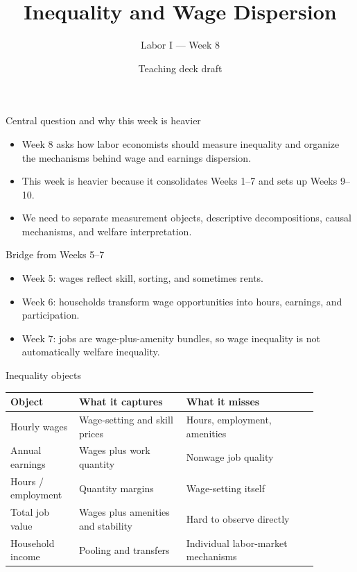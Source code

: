 \documentclass[aspectratio=169,11pt]{beamer}
\title{Inequality and Wage Dispersion}
\subtitle{Labor I --- Week 8}
\author{Teaching deck draft}
\date{}
\begin{document}
\begin{frame}
  \titlepage
\end{frame}

\begin{frame}{Central question and why this week is heavier}
\begin{itemize}
    \item Week 8 asks how labor economists should measure inequality and organize the mechanisms behind wage and earnings dispersion.
    \item This week is heavier because it consolidates Weeks 1--7 and sets up Weeks 9--10.
    \item We need to separate measurement objects, descriptive decompositions, causal mechanisms, and welfare interpretation.
\end{itemize}
\end{frame}

\begin{frame}{Bridge from Weeks 5--7}
\begin{itemize}
    \item Week 5: wages reflect skill, sorting, and sometimes rents.
    \item Week 6: households transform wage opportunities into hours, earnings, and participation.
    \item Week 7: jobs are wage-plus-amenity bundles, so wage inequality is not automatically welfare inequality.
\end{itemize}
\end{frame}

\begin{frame}{Inequality objects}
\small
\begin{tabular}{p{0.19\linewidth} p{0.31\linewidth} p{0.38\linewidth}}
\toprule
Object & What it captures & What it misses \\
\midrule
Hourly wages & Wage-setting and skill prices & Hours, employment, amenities \\
Annual earnings & Wages plus work quantity & Nonwage job quality \\
Hours / employment & Quantity margins & Wage-setting itself \\
Total job value & Wages plus amenities and stability & Hard to observe directly \\
Household income & Pooling and transfers & Individual labor-market mechanisms \\
\bottomrule
\end{tabular}
\end{frame}
\end{document}

